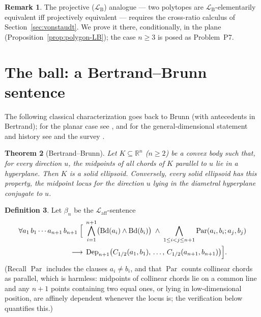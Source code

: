 \documentclass[11pt]{amsart}
\newtheorem{theorem}{Theorem}[section]
\theoremstyle{definition}
\newtheorem{definition}[theorem]{Definition}
\newtheorem{remark}[theorem]{Remark}
\newcommand{\R}{\mathbb{R}}
\newcommand{\Laff}{\mathcal{L}_{\mathrm{aff}}}
\newcommand{\LB}{\mathcal{L}_{\mathrm{B}}}
\newcommand{\Bd}{\operatorname{Bd}}
\newcommand{\Par}{\operatorname{Par}}
\newcommand{\Dep}{\operatorname{Dep}}
\begin{document}
\begin{remark}
The projective ($\LB$) analogue --- two polytopes are $\LB$-elementarily
equivalent iff projectively equivalent --- requires the cross-ratio calculus
of Section~\ref{sec:vonstaudt}. We prove it there, conditionally, in the
plane (Proposition~\ref{prop:polygon-LB}); the case $n\ge3$ is posed as
Problem~P7.
\end{remark}

\section{The ball: a Bertrand--Brunn sentence}\label{sec:ball}

The following classical characterization goes back to Brunn (with
antecedents in Bertrand); for the planar case see \cite{Brunn1889}, and for
the general-dimensional statement and history see
\cite[Theorem~2.12.1]{MMO19} and the survey \cite{Soltan05}.

\begin{theorem}[Bertrand--Brunn]\label{thm:BB}
Let $K\subseteq\R^n$ \textup($n\ge2$\textup) be a convex body such that, for
every direction $u$, the midpoints of all chords of $K$ parallel to $u$ lie
in a hyperplane. Then $K$ is a solid ellipsoid. Conversely, every solid
ellipsoid has this property, the midpoint locus for the direction $u$ lying
in the diametral hyperplane conjugate to $u$.
\end{theorem}

\begin{definition}\label{def:BBsentence}
Let $\beta_n$ be the $\Laff$-sentence
\begin{align*}
\forall a_1\,b_1\cdots a_{n+1}\,b_{n+1}\;
\Bigl[\;&\bigwedge_{i=1}^{n+1}\bigl(\Bd(a_i)\wedge\Bd(b_i)\bigr)
\;\wedge\;\bigwedge_{1\le i<j\le n+1}\Par(a_i,b_i;a_j,b_j)\\
\longrightarrow\;&
\Dep_{n+1}\bigl(C_{1/2}(a_1,b_1),\,\dots,\,C_{1/2}(a_{n+1},b_{n+1})\bigr)
\Bigr].
\end{align*}
(Recall $\Par$ includes the clauses $a_i\ne b_i$, and that $\Par$ counts
collinear chords as parallel, which is harmless: midpoints of collinear
chords lie on a common line and any $n+1$ points containing two equal ones,
or lying in low-dimensional position, are affinely dependent whenever the
locus is; the verification below quantifies this.)
\end{definition}
\end{document}
